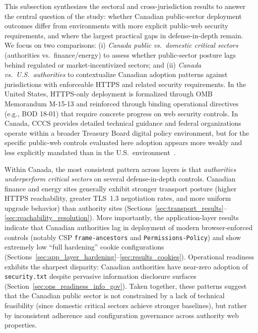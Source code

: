 \documentclass[a4paper,fleqn]{cas-sc}
\begin{document}
    This subsection synthesizes the sectoral and cross-jurisdiction results to answer the central question of the study: whether Canadian public-sector deployment outcomes differ from environments with more explicit public-web security requirements, and where the largest practical gaps in defense-in-depth remain.
    We focus on two comparisons: (i) 
    \emph{Canada public vs.\ domestic critical sectors} (authorities vs.\ finance/energy) to assess whether public-sector posture lags behind regulated or market-incentivized sectors; and 
    (ii) \emph{Canada vs.\ U.S.\ authorities} to contextualize Canadian adoption patterns against jurisdictions with enforceable HTTPS and related security requirements. 
    In the United States, HTTPS-only deployment is formalized through OMB Memorandum M-15-13 and reinforced through binding operational directives (e.g., BOD 18-01) that require concrete progress on web security controls. 
    In Canada, CCCS provides detailed technical guidance and federal organizations operate within a broader Treasury Board digital policy environment, but for the specific public-web controls evaluated here adoption appears more weakly and less explicitly mandated than in the U.S.\ environment~\cite{omb-m-15-13,cisa_bod_18_01,cccs-itsp-40062,cccs-itsm-60005}.

    Within Canada, the most consistent pattern across layers is that \emph{authorities underperform critical sectors} on several defense-in-depth controls. 
    Canadian finance and energy sites generally exhibit stronger transport posture (higher HTTPS reachability, greater TLS~1.3 negotiation rates, and more uniform upgrade behavior) than authority sites (Sections~\ref{sec:transport_results}--\ref{sec:reachability_resolution}). 
    More importantly, the application-layer results indicate that Canadian authorities lag in deployment of modern browser-enforced controls (notably CSP \texttt{frame-ancestors} and \texttt{Permissions-Policy}) and show extremely low ``full hardening'' cookie configurations (Sections~\ref{sec:app_layer_hardening}--\ref{sec:results_cookies}). 
    Operational readiness exhibits the sharpest disparity: Canadian authorities have near-zero adoption of \texttt{security.txt} despite pervasive information disclosure surfaces (Section~\ref{sec:ops_readiness_info_gov}). 
    Taken together, these patterns suggest that the Canadian public sector is not constrained by a lack of technical feasibility (since domestic critical sectors achieve stronger baselines), but rather by inconsistent adherence and configuration governance across authority web properties.
\end{document}
